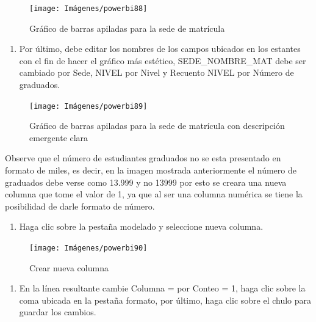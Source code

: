 \documentclass[
]{book}
\providecommand{\tightlist}{%
  \setlength{\itemsep}{0pt}\setlength{\parskip}{0pt}}
\begin{document}
\begin{figure}

{\centering \texttt{[image: Imágenes/powerbi88]} 

}

\caption{Gráfico de barras apiladas para la sede de matrícula}\label{fig:paso7barrasapiladas-fig}
\end{figure}

\begin{enumerate}
\def\labelenumi{\arabic{enumi}.}
\setcounter{enumi}{7}
\tightlist
\item
  Por último, debe editar los nombres de los campos ubicados en los estantes con el fin de hacer el gráfico más estético, SEDE\_NOMBRE\_MAT debe ser cambiado por Sede, NIVEL por Nivel y Recuento NIVEL por Número de graduados.
\end{enumerate}

\begin{figure}

{\centering \texttt{[image: Imágenes/powerbi89]} 

}

\caption{Gráfico de barras apiladas para la sede de matrícula con descripción emergente clara}\label{fig:paso8barrasapiladas-fig}
\end{figure}

Observe que el número de estudiantes graduados no se esta presentado en formato de miles, es decir, en la imagen mostrada anteriormente el número de graduados debe verse como 13.999 y no 13999 por esto se creara una nueva columna que tome el valor de 1, ya que al ser una columna numérica se tiene la posibilidad de darle formato de número.

\begin{enumerate}
\def\labelenumi{\arabic{enumi}.}
\tightlist
\item
  Haga clic sobre la pestaña modelado y seleccione nueva columna.
\end{enumerate}

\begin{figure}

{\centering \texttt{[image: Imágenes/powerbi90]} 

}

\caption{Crear nueva columna}\label{fig:paso1crearconteo-fig}
\end{figure}

\begin{enumerate}
\def\labelenumi{\arabic{enumi}.}
\setcounter{enumi}{1}
\tightlist
\item
  En la línea resultante cambie Columna = por Conteo = 1, haga clic sobre la coma ubicada en la pestaña formato, por último, haga clic sobre el chulo para guardar los cambios.
\end{enumerate}
\end{document}
